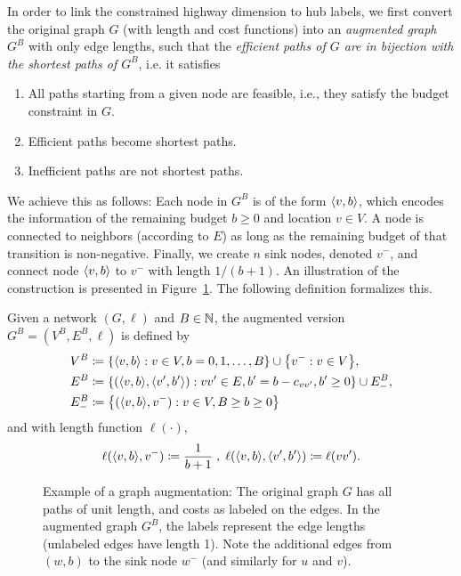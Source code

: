 \label{sec:augmented}
In order to link the constrained highway dimension to hub labels, we first convert the original graph $G$ (with length and cost functions) into an \emph{augmented graph} $G^B$ with only edge lengths, such that the \emph{efficient paths of $G$ are in bijection with the shortest paths of $G^B$}, i.e. it satisfies
\begin{enumerate}[nosep]
\item All paths starting from a given node are feasible, i.e., they satisfy the budget constraint in $G$.
\item Efficient paths become shortest paths.
\item Inefficient paths are not shortest paths.
\end{enumerate}
We achieve this as follows: Each node in $G^B$ is of the form $\langle v,b\rangle$, which encodes the information of the remaining budget $b\geq 0$ and location $v\in V$.
A node is connected to neighbors (according to $E$) as long as the remaining budget of that transition is non-negative.
Finally, we create $n$ sink nodes, denoted $v^-$, and connect node $\langle v,b\rangle$ to $v^-$ with length $1/(b+1)$.
An illustration of the construction is presented in Figure~\ref{fig:augmented}.
The following definition formalizes this. 

\begin{definition}
Given a network $(G,\ell)$ and $B\in\mathbb{N}$, the augmented version $G^B=(V^B,E^B,\ell)$ is defined by
\begin{align*}
V^B &\defeq\crl*{\pp{v,b}: v\in V, b=0,1,\ldots,B}\cup\crl*{v^-:v\in V},\\
E^B &\defeq\crl*{(\pp{v,b},\pp{v',b'}) : vv'\in E, b'=b-c_{vv'}, b'\geq 0}\cup E^{B}_{-},\\
E^{B}_{-} &\defeq \crl*{(\pp{v,b},v^-): v\in V, B\geq b\geq 0}
\end{align*}
and with length function $\ell(\cdot)$,
\begin{align*}
\ell(\langle v,b\rangle,v^-) \coloneqq \frac{1}{b+1}\;,\;
\ell(\langle v,b\rangle,\langle v',b'\rangle) \coloneqq \ell(vv').
\end{align*}
\end{definition}

\begin{figure}

\caption{Example of a graph augmentation: The original graph $G$ has all paths of unit length, and costs as labeled on the edges. In the augmented graph $G^B$, the labels represent the edge lengths (unlabeled edges have length 1). Note the additional edges from $(w,b)$ to the sink node $w^-$ (and similarly for $u$ and $v$). 
}
\label{fig:augmented}
\end{figure}


